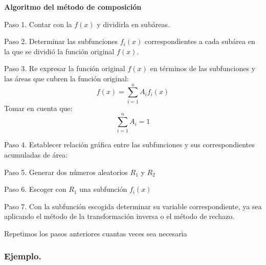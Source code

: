 \documentclass[11pt,letterpaper]{report}
\begin{document}
\textbf{Algoritmo del método de composición}

Paso 1. Contar con la $f(x)$ y dividirla en subáreas.

\begin{center}
\end{center}

Paso 2. Determinar las subfunciones $f_i(x)$ correspondientes a cada subárea en la que se dividió la función original $f(x)$.

\begin{center}
\end{center}

Paso 3. Re expresar la función original $f(x)$ en términos de las subfunciones y las áreas que cubren la función original:
\[
f(x) = \sum_{i=1}^{n} A_i f_i(x)
\]
Tomar en cuenta que:
\[
\sum_{i=1}^{n} A_i = 1
\]

Paso 4. Establecer relación gráfica entre las subfunciones y sus correspondientes acumuladas de área:

\begin{center}
\end{center}

Paso 5. Generar dos números aleatorios $R_1$ y $R_2$

Paso 6. Escoger con $R_1$ una subfunción $f_i(x)$

Paso 7. Con la subfunción escogida determinar su variable correspondiente, ya sea aplicando el método de la transformación inversa o el método de rechazo.

Repetimos los pasos anteriores cuantas veces sea necesaria

\subsubsection*{Ejemplo.}

\begin{center}
\end{center}
\end{document}
